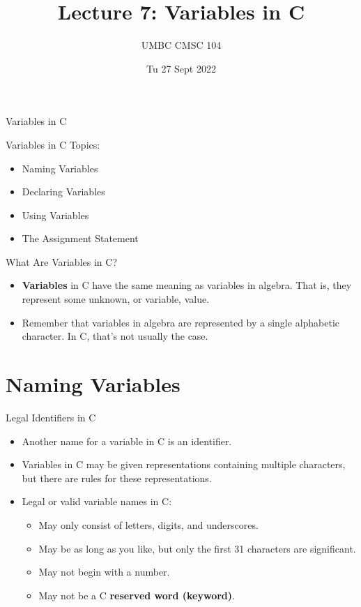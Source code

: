 \documentclass[graphics]{beamer}
\title{Lecture 7: Variables in C}
\author{UMBC CMSC 104}
\date{Tu 27 Sept 2022}
\begin{document}
\begin{frame}{}
\centering
    Variables in C
\end{frame}

\begin{frame}{Variables in C}
    Topics:
    \begin{itemize}
        \item Naming Variables
        \item Declaring Variables
        \item Using Variables
        \item The Assignment Statement
    \end{itemize}
\end{frame}

\begin{frame}{What Are Variables in C?}
    \begin{itemize}
        \item \textbf{Variables} in C have the same meaning as variables in algebra. That is, they represent some unknown, or variable, value. \\
        \item Remember that variables in algebra are represented by a single alphabetic character. In C, that's not usually the case.
    \end{itemize}
\end{frame}

\section*{Naming Variables}
\begin{frame}{Legal Identifiers in C}
    \begin{itemize}
        \item Another name for a variable in C is an identifier.
        \item Variables in C may be given representations containing multiple characters, but there are rules for these representations.
        \item Legal or valid variable names in C:
        \begin{itemize}
            \item May only consist of letters, digits, and underscores.
            \item May be as long as you like, but only the first 31 characters are significant.
            \item May not begin with a number.
            \item May not be a C \textbf{reserved word (keyword)}.
        \end{itemize}
    \end{itemize}
\end{frame}
\end{document}
